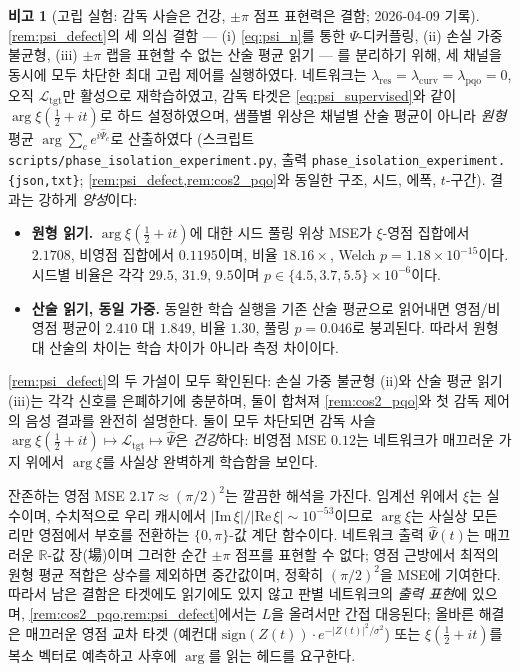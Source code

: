 \documentclass[11pt, a4paper]{article}
\theoremstyle{definition}
\newtheorem{remark}{비고}[section]
\theoremstyle{plain}
\newcommand{\xif}{\xi}
\newcommand{\Psip}{\Psi}
\begin{document}
\begin{remark}[고립 실험: 감독 사슬은 건강, $\pm\pi$ 점프 표현력은 결함; 2026-04-09 기록]
\label{rem:isolation}
\cref{rem:psi_defect}의 세 의심 결함 --- (i) \cref{eq:psi_n}를 통한 $\Psip$-디커플링, (ii) 손실 가중 불균형, (iii) $\pm\pi$ 랩을 표현할 수 없는 산술 평균 읽기 --- 를 분리하기 위해, 세 채널을 동시에 모두 차단한 최대 고립 제어를 실행하였다. 네트워크는 $\lambda_{\mathrm{res}}=\lambda_{\mathrm{curv}}=\lambda_{\mathrm{pqo}}=0$, 오직 $\mathcal{L}_{\mathrm{tgt}}$만 활성으로 재학습하였고, 감독 타겟은 \cref{eq:psi_supervised}와 같이 $\arg\xif(\tfrac{1}{2}+it)$로 하드 설정하였으며, 샘플별 위상은 채널별 산술 평균이 아니라 \emph{원형} 평균 $\arg\sum_c e^{i\hat\Psip_c}$로 산출하였다 (스크립트 \texttt{scripts/phase\_isolation\_experiment.py}, 출력 \texttt{phase\_isolation\_experiment.\{json,txt\}}; \cref{rem:psi_defect,rem:cos2_pqo}와 동일한 구조, 시드, 에폭, $t$-구간).
결과는 강하게 \emph{양성}이다:
\begin{itemize}
  \item \textbf{원형 읽기.} $\arg\xif(\tfrac{1}{2}+it)$에 대한 시드 풀링 위상 MSE가 $\xif$-영점 집합에서 $2.1708$, 비영점 집합에서 $0.1195$이며, 비율 $18.16\times$, Welch $p=1.18\times10^{-15}$이다. 시드별 비율은 각각 $29.5,\,31.9,\,9.5$이며 $p\in\{4.5,3.7,5.5\}\times10^{-6}$이다.
  \item \textbf{산술 읽기, 동일 가중.} 동일한 학습 실행을 기존 산술 평균으로 읽어내면 영점/비영점 평균이 $2.410$ 대 $1.849$, 비율 $1.30$, 풀링 $p=0.046$로 붕괴된다. 따라서 원형 대 산술의 차이는 학습 차이가 아니라 측정 차이이다.
\end{itemize}
\cref{rem:psi_defect}의 두 가설이 모두 확인된다: 손실 가중 불균형 (ii)와 산술 평균 읽기 (iii)는 각각 신호를 은폐하기에 충분하며, 둘이 합쳐져 \cref{rem:cos2_pqo}와 첫 감독 제어의 음성 결과를 완전히 설명한다. 둘이 모두 차단되면 감독 사슬 $\arg\xif(\tfrac{1}{2}+it)\mapsto\mathcal{L}_{\mathrm{tgt}}\mapsto\hat\Psip$은 \emph{건강}하다: 비영점 MSE $0.12$는 네트워크가 매끄러운 가지 위에서 $\arg\xif$를 사실상 완벽하게 학습함을 보인다.

\smallskip
잔존하는 영점 MSE $2.17\approx(\pi/2)^2$는 깔끔한 해석을 가진다. 임계선 위에서 $\xif$는 실수이며, 수치적으로 우리 캐시에서 $|\mathrm{Im}\,\xi|/|\mathrm{Re}\,\xi|\sim10^{-53}$이므로 $\arg\xif$는 사실상 모든 리만 영점에서 부호를 전환하는 $\{0,\pi\}$-값 계단 함수이다. 네트워크 출력 $\hat\Psip(t)$는 매끄러운 $\mathbb{R}$-값 장(場)이며 그러한 순간 $\pm\pi$ 점프를 표현할 수 없다; 영점 근방에서 최적의 원형 평균 적합은 상수를 제외하면 중간값이며, 정확히 $(\pi/2)^2$을 MSE에 기여한다. 따라서 남은 결함은 타겟에도 읽기에도 있지 않고 판별 네트워크의 \emph{출력 표현}에 있으며, \cref{rem:cos2_pqo,rem:psi_defect}에서는 $L$을 올려서만 간접 대응된다; 올바른 해결은 매끄러운 영점 교차 타겟 (예컨대 $\mathrm{sign}(Z(t))\cdot e^{-|Z(t)|^2/\sigma^2}$) 또는 $\xif(\tfrac{1}{2}+it)$를 복소 벡터로 예측하고 사후에 $\arg$를 읽는 헤드를 요구한다.


\end{remark}
\end{document}

